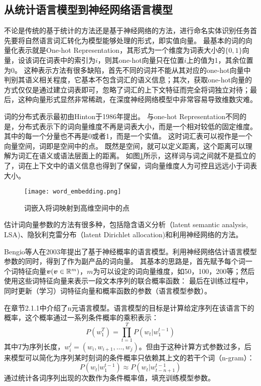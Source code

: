 \subsection{从统计语言模型到神经网络语言模型}
不论是传统的基于统计的方法还是基于神经网络的方法，进行命名实体识别任务首先要将自然语言词汇转化为模型能够处理的形式，即实值向量。
最基本的词的向量化表示就是One-hot Representation，其形式为一个维度为词表大小的$\{0, 1\}$向量，设该词在词表中的索引为$i$，则其one-hot向量只在位置$i$上的值为1，其余位置为0。
这种表示方法有很多缺陷，首先不同的词并不能从其对应的one-hot向量中判别其语义相关程度，它基本不包含词汇的语义信息；其次，获取one-hot向量的方式仅仅是通过建立词表即可，忽略了词汇的上下文特征而完全将词独立对待；最后，这种向量形式显然非常稀疏，在深度神经网络模型中非常容易导致维数灾难。

词的分布式表示最初由Hinton于1986年提出。
与one-hot Representation不同的是，分布式表示下的词向量维度不再是词表大小，而是一个相对较低的固定维度。其中的每一个分量也不再是0或者1，而是一个实值。
这时词汇表可以视作是一个向量空间，词即是空间中的点。
既然是空间，就可以定义距离，这个距离可以理解为词汇在语义或语法层面上的距离。
如图\ref{fig:word_embedding}所示，这样词与词之间就不是孤立的了，词在上下文中的语义信息也得到了保留，词向量维度人为可控且远远小于词表大小。

\begin{figure}[!htpb]
    \centering
    \texttt{[image: word\_embedding.png]}
    \caption{词嵌入将词映射到高维空间中的点}
    \label{fig:word_embedding}
\end{figure}

估计词向量参数的方法有很多种，包括隐含语义分析（latent semantic analysis, LSA)、隐狄利克雷分布（latent Dirichlet allocation)和利用神经网络的方法。

Bengio等人在2003年提出了基于神经概率的语言模型。利用神经网络估计语言模型参数的同时，得到了作为副产品的词向量。
其基本的思路是，首先赋予每个词一个词特征向量$\boldsymbol{v}(\boldsymbol{v}\in \mathbb{R}^m)$，$m$为可以设定的词向量维度，如50，100，200等；然后使用这些词特征向量来表示一段文本序列的联合概率函数：
最后在训练过程中，同时更新（学习）词特征向量和概率函数的参数（语言模型参数）。

在章节2.1.1中介绍了n元语言模型。语言模型的目标是计算给定序列在该语言下的概率，这个概率通过一系列条件概率的乘积表示：
\begin{equation}
    P(w^T_1) = \prod^{T}_{t=1}P(w_t|w_1^{t-1})
\end{equation}
其中$T$为序列长度，$w_i^j = (w_i, w_{i+1},\dots, w_j)$。但由于这种计算方式参数过多，后来模型可以简化为序列某时刻词的条件概率只依赖其上文的若干个词（n-gram）：
\begin{equation}
    P(w_t|w_1^{t-1}) \approx P(w_t|w^{t-1}_{t-n+1})
\end{equation}
通过统计各词序列出现的次数作为条件概率值，填充训练模型参数。

